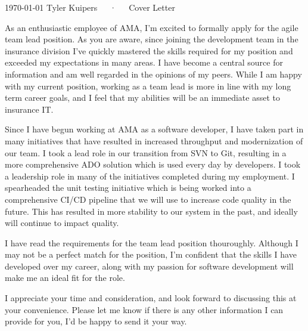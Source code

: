 \documentclass[11pt, a4paper]{awesome-cv}
\begin{document}
\makecvheader[R]

\makecvfooter
  {\today}
  {Tyler Kuipers~~~·~~~Cover Letter}
  {\thepage}

\makelettertitle


\begin{cvletter}
As an enthusiastic employee of AMA, I'm excited to formally apply for the agile team lead position.  As you are aware, since joining the development team in the insurance 
division I've quickly mastered the skills required for my position and exceeded my expectations in many areas.  I have become a central source for information and am well 
regarded in the opinions of my peers.  While I am happy with my current position, working as a team lead is more in line with my long term career goals, and I feel that
my abilities will be an immediate asset to insurance IT.

Since I have begun working at AMA as a software developer, I have taken part in many initiatives that have resulted in increased throughput and modernization of our team.
I took a lead role in our transition from SVN to Git, resulting in a more comprehensive ADO solution which is used every day by developers.  I took a leadership role
in many of the initiatives completed during my employment.  I spearheaded the unit testing initiative which is being worked into a comprehensive CI/CD pipeline that we 
will use to increase code quality in the future.  This has resulted in more stability to our system in the past, and ideally will continue to impact quality.

I have read the requirements for the team lead position thouroughly.  Although I may not be a perfect match for the position, I'm confident that the skills I have 
developed over my career, along with my passion for software development will make me an ideal fit for the role.

I appreciate your time and consideration, and look forward to discussing this at your convenience.  Please let me know if there is any other information
I can provide for you, I'd be happy to send it your way.

\end{cvletter}

\makeletterclosing



\end{document}

